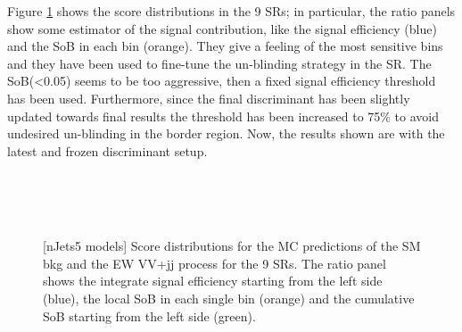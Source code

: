 Figure \ref{fig:RNN_SoB_nJets5} shows the score distributions in the 9 SRs; 
in particular, the ratio panels show some estimator of the signal contribution, 
like the signal efficiency (blue) and the SoB in each bin (orange). 
They give a feeling of the most sensitive bins and they have been used to fine-tune the un-blinding strategy in the SR. 
The SoB(<0.05) seems to be too aggressive, then a fixed signal efficiency threshold has been used. 
Furthermore, since the final discriminant has been slightly updated towards final results 
the threshold has been increased to 75\% to avoid undesired un-blinding in the border region.
Now, the results shown are with the latest and frozen discriminant setup.

\begin{figure}[ht]
      \centering
        \\

        \\

        \\

       \caption{[nJets5 models] Score distributions for the MC predictions of the SM bkg and the EW VV+jj process for the 9 SRs. The ratio panel shows the integrate signal efficiency starting from the left side (blue), the local SoB in each single bin (orange) and the cumulative SoB starting from the left side (green).}
       \label{fig:RNN_SoB_nJets5}
\end{figure}

